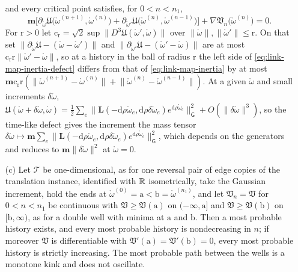 \begin{enumerate}
and every critical point satisfies, for $0<n<n_1$,
\begin{equation}
\mathbf m\bigl[\partial_{\mathring\omega}\mathfrak U\bigl(\mathring\omega^{(n+1)},\mathring\omega^{(n)}\bigr)+\partial_{\mathring\omega'}\mathfrak U\bigl(\mathring\omega^{(n)},\mathring\omega^{(n-1)}\bigr)\bigr]+\nabla\mathfrak V_n\bigl(\mathring\omega^{(n)}\bigr)=0.
\label{eq:link-map-inertia-defect}
\end{equation}
For $\mathrm r>0$ let $\mathrm c_{\mathrm r}=\sqrt2\sup\lVert D^3\mathfrak U(\mathring\omega',\mathring\omega)\rVert$ over
$\lVert\mathring\omega\rVert,\lVert\mathring\omega'\rVert\leq\mathrm r$. On that set
$\lVert\partial_{\mathring\omega}\mathfrak U-(\mathring\omega-\mathring\omega')\rVert$ and
$\lVert\partial_{\mathring\omega'}\mathfrak U-(\mathring\omega'-\mathring\omega)\rVert$ are at most
$\mathrm c_{\mathrm r}\mathrm r\lVert\mathring\omega'-\mathring\omega\rVert$, so at a history in the ball of radius $\mathrm r$
the left side of \eqref{eq:link-map-inertia-defect} differs from that of \eqref{eq:link-map-inertia}
by at most
$\mathbf m\mathrm c_{\mathrm r}\mathrm r(\lVert\mathring\omega^{(n+1)}-\mathring\omega^{(n)}\rVert+\lVert\mathring\omega^{(n)}-\mathring\omega^{(n-1)}\rVert)$.
At a given $\mathring\omega$ and small increments $\delta\mathring\omega$,
$\mathfrak U(\mathring\omega+\delta\mathring\omega,\mathring\omega)=\tfrac12\sum_e\lVert\mathbf L(-\mathrm d\rho\mathring\omega_e,\mathrm d\rho\delta\mathring\omega_e)e^{\mathrm d\rho\mathring\omega_e}\rVert_{\mathsf G}^2+O(\lVert\delta\mathring\omega\rVert^3)$,
so the time-like defect gives the increment the mass tensor
$\delta\mathring\omega\mapsto\mathbf m\sum_e\lVert\mathbf L(-\mathrm d\rho\mathring\omega_e,\mathrm d\rho\delta\mathring\omega_e)e^{\mathrm d\rho\mathring\omega_e}\rVert_{\mathsf G}^2$,
which depends on the generators and reduces to $\mathbf m\lVert\delta\mathring\omega\rVert^2$ at
$\mathring\omega=0$.
\item[(c)] Let $\mathscr T$ be one-dimensional, as for one reversal pair of edge copies of the
translation instance, identified with $\mathbb R$ isometrically, take the Gaussian increment, hold the ends
at $\mathring\omega^{(0)}=\mathrm a<\mathrm b=\mathring\omega^{(n_1)}$, and let $\mathfrak V_n=\mathfrak V$
for $0<n<n_1$ be continuous with $\mathfrak V\geq\mathfrak V(\mathrm a)$ on $(-\infty,\mathrm a]$ and
$\mathfrak V\geq\mathfrak V(\mathrm b)$ on $[\mathrm b,\infty)$, as for a double well with minima at
$\mathrm a$ and $\mathrm b$. Then a most probable history exists, and every most probable history is
nondecreasing in $n$; if moreover $\mathfrak V$ is differentiable with
$\mathfrak V'(\mathrm a)=\mathfrak V'(\mathrm b)=0$, every most probable history is strictly
increasing. The most probable path between the wells is a monotone kink and does not oscillate.
\end{enumerate}

